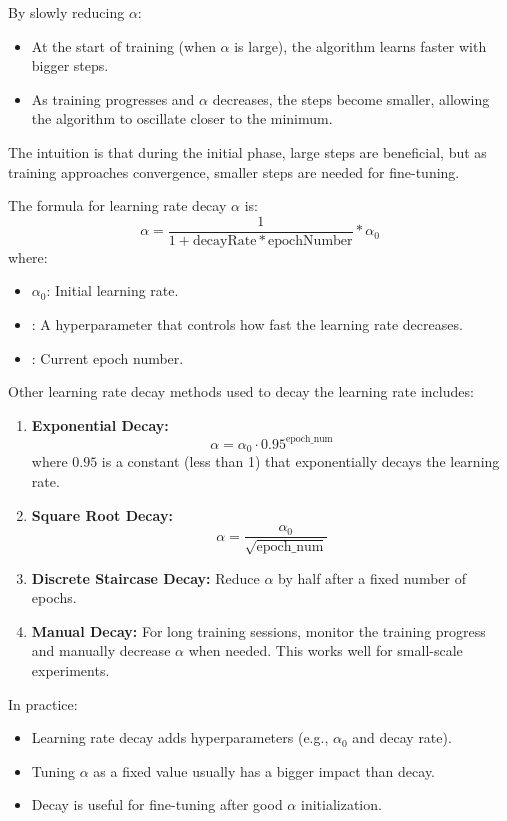 \documentclass[letterpaper,12pt,notitlepage,twoside]{report}
\begin{document}
By slowly reducing \( \alpha \):
\begin{itemize}[noitemsep, topsep=0pt]
    \item At the start of training (when \( \alpha \) is large), the algorithm learns faster with bigger steps.
    \item As training progresses and \( \alpha \) decreases, the steps become smaller, allowing the algorithm to oscillate closer to the minimum.
\end{itemize}

The intuition is that during the initial phase, large steps are beneficial, but as training approaches convergence, smaller steps are needed for fine-tuning.

The formula for learning rate decay \(\alpha\) is:
\[ \alpha = \frac{1}{1+\text{decayRate}*\text{epochNumber}}*\alpha_0\]
where:
\begin{itemize}[noitemsep, topsep=0pt]
    \item \( \alpha_0 \): Initial learning rate.
    \item {}: A hyperparameter that controls how fast the learning rate decreases.
    \item {}: Current epoch number.
\end{itemize}

Other learning rate decay methods used to decay the learning rate includes:
\begin{enumerate}
    \item \textbf{Exponential Decay:}
    \[
    \alpha = \alpha_0 \cdot 0.95^{\text{epoch\_num}}
    \]
    where \( 0.95 \) is a constant (less than 1) that exponentially decays the learning rate.

    \item \textbf{Square Root Decay:}
    \[
    \alpha = \frac{\alpha_0}{\sqrt{\text{epoch\_num}}}
    \]

    \item \textbf{Discrete Staircase Decay:}
    Reduce \( \alpha \) by half after a fixed number of epochs.

    \item \textbf{Manual Decay:}
    For long training sessions, monitor the training progress and manually decrease \( \alpha \) when needed. This works well for small-scale experiments.
\end{enumerate}

In practice:
\begin{itemize}[noitemsep, topsep=0pt]
	\item Learning rate decay adds hyperparameters (e.g., \(\alpha_0\) and decay rate).
	\item Tuning \(\alpha\) as a fixed value usually has a bigger impact than decay.
	\item Decay is useful for fine-tuning after good \(\alpha\) initialization.
\end{itemize}
\end{document}
